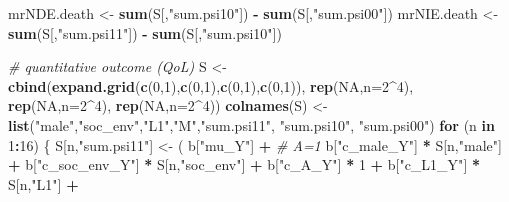 \documentclass[
]{book}
\newenvironment{Shaded}{\begin{snugshade}}{\end{snugshade}}
\newcommand{\AttributeTok}[1]{\textcolor[rgb]{0.13,0.29,0.53}{#1}}
\newcommand{\CommentTok}[1]{\textcolor[rgb]{0.56,0.35,0.01}{\textit{#1}}}
\newcommand{\ConstantTok}[1]{\textcolor[rgb]{0.56,0.35,0.01}{#1}}
\newcommand{\ControlFlowTok}[1]{\textcolor[rgb]{0.13,0.29,0.53}{\textbf{#1}}}
\newcommand{\DecValTok}[1]{\textcolor[rgb]{0.00,0.00,0.81}{#1}}
\newcommand{\FunctionTok}[1]{\textcolor[rgb]{0.13,0.29,0.53}{\textbf{#1}}}
\newcommand{\NormalTok}[1]{#1}
\newcommand{\OtherTok}[1]{\textcolor[rgb]{0.56,0.35,0.01}{#1}}
\newcommand{\SpecialCharTok}[1]{\textcolor[rgb]{0.81,0.36,0.00}{\textbf{#1}}}
\newcommand{\StringTok}[1]{\textcolor[rgb]{0.31,0.60,0.02}{#1}}
\begin{document}
\begin{Shaded}
\begin{Highlighting}[]
\NormalTok{  mrNDE.death }\OtherTok{\textless{}{-}} \FunctionTok{sum}\NormalTok{(S[,}\StringTok{"sum.psi10"}\NormalTok{]) }\SpecialCharTok{{-}} \FunctionTok{sum}\NormalTok{(S[,}\StringTok{"sum.psi00"}\NormalTok{])}
\NormalTok{  mrNIE.death }\OtherTok{\textless{}{-}} \FunctionTok{sum}\NormalTok{(S[,}\StringTok{"sum.psi11"}\NormalTok{]) }\SpecialCharTok{{-}} \FunctionTok{sum}\NormalTok{(S[,}\StringTok{"sum.psi10"}\NormalTok{])}
  
  \CommentTok{\# quantitative outcome (QoL)}
\NormalTok{  S }\OtherTok{\textless{}{-}} \FunctionTok{cbind}\NormalTok{(}\FunctionTok{expand.grid}\NormalTok{(}\FunctionTok{c}\NormalTok{(}\DecValTok{0}\NormalTok{,}\DecValTok{1}\NormalTok{),}\FunctionTok{c}\NormalTok{(}\DecValTok{0}\NormalTok{,}\DecValTok{1}\NormalTok{),}\FunctionTok{c}\NormalTok{(}\DecValTok{0}\NormalTok{,}\DecValTok{1}\NormalTok{),}\FunctionTok{c}\NormalTok{(}\DecValTok{0}\NormalTok{,}\DecValTok{1}\NormalTok{)), }\FunctionTok{rep}\NormalTok{(}\ConstantTok{NA}\NormalTok{,}\AttributeTok{n=}\DecValTok{2}\SpecialCharTok{\^{}}\DecValTok{4}\NormalTok{), }
             \FunctionTok{rep}\NormalTok{(}\ConstantTok{NA}\NormalTok{,}\AttributeTok{n=}\DecValTok{2}\SpecialCharTok{\^{}}\DecValTok{4}\NormalTok{), }\FunctionTok{rep}\NormalTok{(}\ConstantTok{NA}\NormalTok{,}\AttributeTok{n=}\DecValTok{2}\SpecialCharTok{\^{}}\DecValTok{4}\NormalTok{))}
  \FunctionTok{colnames}\NormalTok{(S) }\OtherTok{\textless{}{-}} \FunctionTok{list}\NormalTok{(}\StringTok{"male"}\NormalTok{,}\StringTok{"soc\_env"}\NormalTok{,}\StringTok{"L1"}\NormalTok{,}\StringTok{"M"}\NormalTok{,}\StringTok{"sum.psi11"}\NormalTok{, }\StringTok{"sum.psi10"}\NormalTok{, }
                      \StringTok{"sum.psi00"}\NormalTok{)}
  \ControlFlowTok{for}\NormalTok{ (n }\ControlFlowTok{in} \DecValTok{1}\SpecialCharTok{:}\DecValTok{16}\NormalTok{) \{}
\NormalTok{    S[n,}\StringTok{"sum.psi11"}\NormalTok{] }\OtherTok{\textless{}{-}}\NormalTok{  ( b[}\StringTok{"mu\_Y"}\NormalTok{] }\SpecialCharTok{+}                                          \CommentTok{\# A=1}
\NormalTok{                             b[}\StringTok{"c\_male\_Y"}\NormalTok{] }\SpecialCharTok{*}\NormalTok{ S[n,}\StringTok{"male"}\NormalTok{] }\SpecialCharTok{+} 
\NormalTok{                             b[}\StringTok{"c\_soc\_env\_Y"}\NormalTok{] }\SpecialCharTok{*}\NormalTok{ S[n,}\StringTok{"soc\_env"}\NormalTok{] }\SpecialCharTok{+} 
\NormalTok{                             b[}\StringTok{"c\_A\_Y"}\NormalTok{] }\SpecialCharTok{*} \DecValTok{1} \SpecialCharTok{+} 
\NormalTok{                             b[}\StringTok{"c\_L1\_Y"}\NormalTok{] }\SpecialCharTok{*}\NormalTok{ S[n,}\StringTok{"L1"}\NormalTok{] }\SpecialCharTok{+}

\end{Highlighting}
\end{Shaded}
\end{document}
